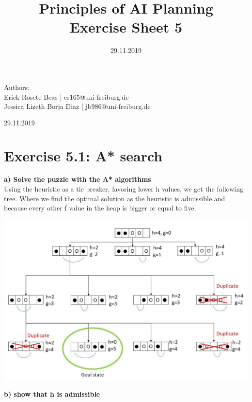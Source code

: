 \documentclass[12pt,a4paper]{article}
\title{\textbf{Principles of AI Planning
		\\{\Large Exercise Sheet 5}}}
\date{29.11.2019}
\begin{document}
	\begin{flushleft}
		Authors:\\
		Erick Rosete Beas | er165@uni-freiburg.de\\
		Jessica Lizeth Borja Diaz | jb986@uni-freiburg.de\\
	\end{flushleft}
	{\let\newpage\relax\maketitle}
	\begin{center} 
		\large 29.11.2019 
	\end{center}

\hfill\break
\section*{Exercise 5.1: A* search}
	\textbf{a) Solve the puzzle with the A* algorithms}\\
	Using the heuristic as a tie breaker, favoring lower h values,
	we get the following tree.
	Where we find the optimal solution as the heuristic is admissible and
	because every other f value in the heap is bigger or equal to five.
	\begin{center}
		\includegraphics[scale=0.4]{A_star_0.jpg}\\
	\end{center}
	\textbf{b) show that h is admissible}
\end{document}
